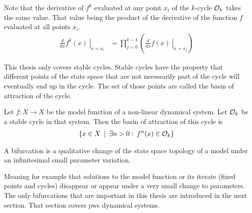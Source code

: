 Note that the derivative of $f^k$ evaluated at any point $x_i$ of the $k$-cycle $\mathcal{O}_k$ takes the same value.
That value being the product of the derivative of the function $f$ evaluated at all points $x_i$.
\begin{align}
	\left. \frac{d}{dx}f^k(x) \:\right|_{x = x_i} & = \prod_{j=0}^{k-1} \left( \left. \frac{d}{dx} f(x) \:\right|_{x = x_j} \right)
\end{align}

This thesis only covers stable cycles.
Stable cycles have the property that different points of the state space that are not necessarily part of the cycle will eventually end up in the cycle.
The set of those points are called the basin of attraction of the cycle.

\begin{definition}
	Let $f: X \to X$ be the model function of a non-linear dynamical system.
	Let $\mathcal{O}_k$ be a stable cycle in that system.
	Then the basin of attraction of this cycle is
	\begin{align}
		\left\{x \in X \:\mid\: \exists n > 0: \:f^n(x) \in \mathcal{O}_k\right\}
	\end{align}
\end{definition}

\begin{definition}[Bifurcation]
	A bifurcation is a qualitative change of the state space topology of a model under an infinitesimal small parameter variation.
\end{definition}
Meaning for example that solutions to the model function or its iterate (fixed points and cycles) disappear or appear under a very small change to parameters.
The only bifurcations that are important in this thesis are introduced in the next section.
That section covers \gls{pws} dynamical systems.
